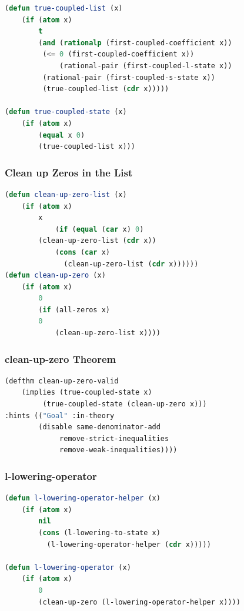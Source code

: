 \documentclass[
paper=128mm:96mm, %
fontsize=11pt, %
pagesize, %
parskip=half-, %
]{scrartcl} %
\theoremstyle{mythmstyle} %
\begin{document}
\clearpage

\begin{lstlisting}[language=Lisp,breaklines=true]
(defun true-coupled-list (x)
	(if (atom x)
	    t
	    (and (rationalp (first-coupled-coefficient x))
		 (<= 0 (first-coupled-coefficient x))
	         (rational-pair (first-coupled-l-state x))
		 (rational-pair (first-coupled-s-state x))
		 (true-coupled-list (cdr x)))))

(defun true-coupled-state (x)
	(if (atom x)
	    (equal x 0)
	    (true-coupled-list x)))
\end{lstlisting}
\clearpage

\subsubsection{Clean up Zeros in the List}

\begin{lstlisting}[language=Lisp,breaklines=true]
(defun clean-up-zero-list (x) 
	(if (atom x)
	    x
            (if (equal (car x) 0)
		(clean-up-zero-list (cdr x))
	        (cons (car x)
		      (clean-up-zero-list (cdr x))))))
(defun clean-up-zero (x)
	(if (atom x)
	    0
	    (if (all-zeros x)
		0
	        (clean-up-zero-list x))))
\end{lstlisting}

\clearpage

\subsubsection{clean-up-zero Theorem}

\begin{lstlisting}[language=Lisp,breaklines=true]
(defthm clean-up-zero-valid 
	(implies (true-coupled-state x)
		 (true-coupled-state (clean-up-zero x)))
:hints (("Goal" :in-theory 
		(disable same-denominator-add 
			 remove-strict-inequalities 
			 remove-weak-inequalities))))
\end{lstlisting}
\clearpage

\subsubsection{l-lowering-operator}

\begin{lstlisting}[language=Lisp,breaklines=true]
(defun l-lowering-operator-helper (x)
	(if (atom x)
	    nil
	    (cons (l-lowering-to-state x) 
		  (l-lowering-operator-helper (cdr x)))))

(defun l-lowering-operator (x)
	(if (atom x)
	    0
	    (clean-up-zero (l-lowering-operator-helper x))))
\end{lstlisting}
\end{document}
